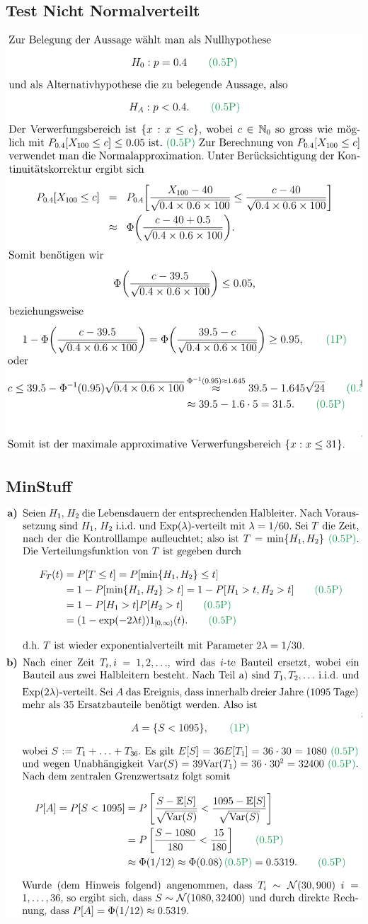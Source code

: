 \subsection{Test Nicht Normalverteilt}
\includegraphics[width=\linewidth]{./Figures/Test_Nicht_Normalverteilt.png}

\subsection{MinStuff}
\includegraphics[width=\linewidth]{./Figures/ExampleMinStuff.png}

